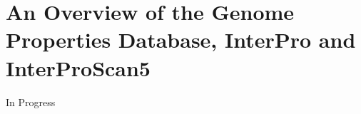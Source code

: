 \chapter{An Overview of the Genome Properties Database, InterPro and InterProScan5} \label{genome-properties} 

In Progress
